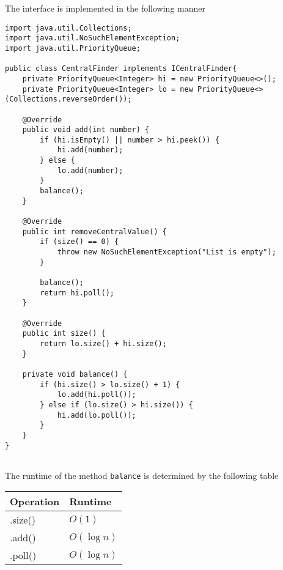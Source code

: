 \documentclass{article}
\begin{document}
    \begin{ans}
        The interface is implemented in the following manner

        \begin{lstlisting}
import java.util.Collections;
import java.util.NoSuchElementException;
import java.util.PriorityQueue;

public class CentralFinder implements ICentralFinder{
    private PriorityQueue<Integer> hi = new PriorityQueue<>();
    private PriorityQueue<Integer> lo = new PriorityQueue<>(Collections.reverseOrder());

    @Override
    public void add(int number) {
        if (hi.isEmpty() || number > hi.peek()) {
            hi.add(number);
        } else {
            lo.add(number);
        }
        balance();
    }

    @Override
    public int removeCentralValue() {
        if (size() == 0) {
            throw new NoSuchElementException("List is empty");
        }

        balance();
        return hi.poll();
    }

    @Override
    public int size() {
        return lo.size() + hi.size();
    }

    private void balance() {
        if (hi.size() > lo.size() + 1) {
            lo.add(hi.poll());
        } else if (lo.size() > hi.size()) {
            hi.add(lo.poll());
        }
    }
}
 
        \end{lstlisting}
        
    The runtime of the method \texttt{balance} is determined by the following table

    \begin{table}[H]
        \begin{center}
            \begin{tabular}[c]{|l|l|}
                \hline
                 Operation & Runtime  \\
                \hline
                 .size() & \( O(1) \)  \\
                 .add() & \( O \left( \log n \right)  \)  \\
                .poll()& \( O \left( \log n \right) \) \\
                \hline
            \end{tabular}
        \end{center}
    \end{table}


\end{ans}
\end{document}

